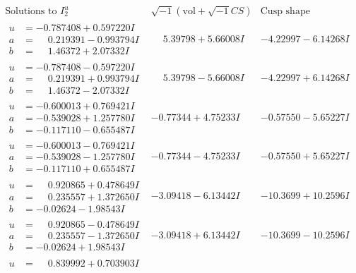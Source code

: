 \documentclass[1p]{elsarticle_modified}
\theoremstyle{definition}
\newcommand{\I}{\sqrt{-1}}
\begin{document}
$$\begin{array}{c|c|c}  
\text{Solutions to }I^u_{2}& \I (\text{vol} + \sqrt{-1}CS) & \text{Cusp shape}\\
 \hline 
\begin{aligned}
u &= -0.787408 + 0.597220 I \\
a &= \phantom{-}0.219391 - 0.993794 I \\
b &= \phantom{-}1.46372 + 2.07332 I\end{aligned}
 & \phantom{-}5.39798 + 5.66008 I & -4.22997 - 6.14268 I \\ \hline\begin{aligned}
u &= -0.787408 - 0.597220 I \\
a &= \phantom{-}0.219391 + 0.993794 I \\
b &= \phantom{-}1.46372 - 2.07332 I\end{aligned}
 & \phantom{-}5.39798 - 5.66008 I & -4.22997 + 6.14268 I \\ \hline\begin{aligned}
u &= -0.600013 + 0.769421 I \\
a &= -0.539028 + 1.257780 I \\
b &= -0.117110 - 0.655487 I\end{aligned}
 & -0.77344 + 4.75233 I & -0.57550 - 5.65227 I \\ \hline\begin{aligned}
u &= -0.600013 - 0.769421 I \\
a &= -0.539028 - 1.257780 I \\
b &= -0.117110 + 0.655487 I\end{aligned}
 & -0.77344 - 4.75233 I & -0.57550 + 5.65227 I \\ \hline\begin{aligned}
u &= \phantom{-}0.920865 + 0.478649 I \\
a &= \phantom{-}0.235557 + 1.372650 I \\
b &= -0.02624 - 1.98543 I\end{aligned}
 & -3.09418 - 6.13442 I & -10.3699 + 10.2596 I \\ \hline\begin{aligned}
u &= \phantom{-}0.920865 - 0.478649 I \\
a &= \phantom{-}0.235557 - 1.372650 I \\
b &= -0.02624 + 1.98543 I\end{aligned}
 & -3.09418 + 6.13442 I & -10.3699 - 10.2596 I \\ \hline\begin{aligned}
u &= \phantom{-}0.839992 + 0.703903 I \\

\end{aligned}
\end{array}$$
\end{document}
